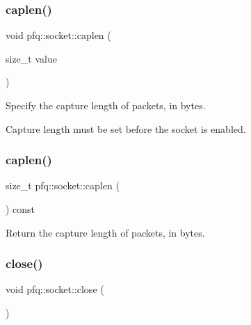 \subsubsection{\texorpdfstring{caplen()}{caplen()}\hspace{0.1cm}{\footnotesize\ttfamily [1/2]}}
{\footnotesize\ttfamily void pfq\+::socket\+::caplen (\begin{DoxyParamCaption}\item[{size\+\_\+t}]{value }\end{DoxyParamCaption})\hspace{0.3cm}{\ttfamily [inline]}}



Specify the capture length of packets, in bytes. 

Capture length must be set before the socket is enabled. \mbox{\label{classpfq_1_1socket_aa0052a8337748212d02fadb229d71108}} 
\subsubsection{\texorpdfstring{caplen()}{caplen()}\hspace{0.1cm}{\footnotesize\ttfamily [2/2]}}
{\footnotesize\ttfamily size\+\_\+t pfq\+::socket\+::caplen (\begin{DoxyParamCaption}{ }\end{DoxyParamCaption}) const\hspace{0.3cm}{\ttfamily [inline]}}



Return the capture length of packets, in bytes. 

\mbox{\label{classpfq_1_1socket_a4c179188ea8fceeb5fd47d52f93c6bda}} 
\subsubsection{\texorpdfstring{close()}{close()}}
{\footnotesize\ttfamily void pfq\+::socket\+::close (\begin{DoxyParamCaption}{ }\end{DoxyParamCaption})\hspace{0.3cm}{\ttfamily [inline]}}



